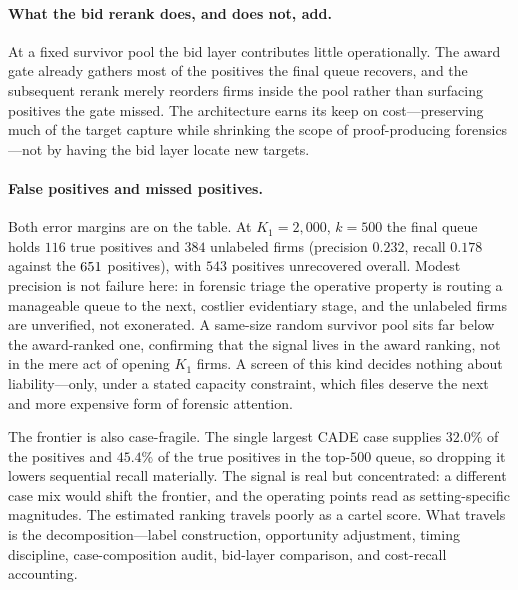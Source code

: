 \paragraph{What the bid rerank does, and does not, add.}
At a fixed survivor pool the bid layer contributes little
operationally. The award gate already gathers most of the positives
the final queue recovers, and the subsequent rerank merely reorders
firms inside the pool rather than surfacing positives the gate missed.
The architecture earns its keep on cost---preserving much of the target
capture while shrinking the scope of proof-producing forensics---not by
having the bid layer locate new targets.

\paragraph{False positives and missed positives.}
Both error margins are on the table. At $K_1=2{,}000$, $k=500$ the
final queue holds $116$ true positives and $384$ unlabeled firms
(precision $0.232$, recall $0.178$ against the $651$
positives), with $543$ positives unrecovered overall. Modest precision
is not failure here: in forensic triage the operative property is
routing a manageable queue to the next, costlier evidentiary stage, and
the unlabeled firms are unverified, not exonerated. A same-size random
survivor pool sits far below the award-ranked one, confirming that the
signal lives in the award ranking, not in the mere act of opening $K_1$
firms. A screen of this kind decides nothing about liability---only,
under a stated capacity constraint, which files deserve the next and
more expensive form of forensic attention.

The frontier is also case-fragile. The single largest CADE case
supplies $32.0\%$ of the positives and $45.4\%$ of the true positives
in the top-$500$ queue, so dropping it lowers sequential recall
materially. The signal is real but concentrated: a different case mix
would shift the frontier, and the operating points read as
setting-specific magnitudes. The estimated ranking travels poorly as a
cartel score. What travels is the decomposition---label construction,
opportunity adjustment, timing discipline, case-composition audit,
bid-layer comparison, and cost-recall accounting.


